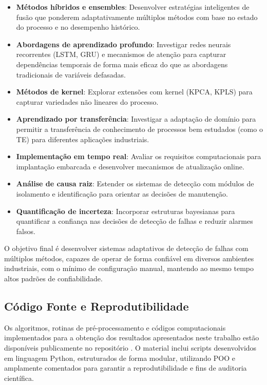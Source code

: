 \documentclass[journal]{IEEEtran}
\begin{document}
\begin{itemize}
    \item \textbf{Métodos híbridos e ensembles}: Desenvolver estratégias inteligentes de fusão que ponderem adaptativamente múltiplos métodos com base no estado do processo e no desempenho histórico.
    \item \textbf{Abordagens de aprendizado profundo}: Investigar redes neurais recorrentes (LSTM, GRU) e mecanismos de atenção para capturar dependências temporais de forma mais eficaz do que as abordagens tradicionais de variáveis defasadas.
    \item \textbf{Métodos de kernel}: Explorar extensões com kernel (KPCA, KPLS) para capturar variedades não lineares do processo.
    \item \textbf{Aprendizado por transferência}: Investigar a adaptação de domínio para permitir a transferência de conhecimento de processos bem estudados (como o TE) para diferentes aplicações industriais.
    \item \textbf{Implementação em tempo real}: Avaliar os requisitos computacionais para implantação embarcada e desenvolver mecanismos de atualização online.
    \item \textbf{Análise de causa raiz}: Estender os sistemas de detecção com módulos de isolamento e identificação para orientar as decisões de manutenção.
    \item \textbf{Quantificação de incerteza}: Incorporar estruturas bayesianas para quantificar a confiança nas decisões de detecção de falhas e reduzir alarmes falsos.
\end{itemize}

O objetivo final é desenvolver sistemas adaptativos de detecção de falhas com múltiplos métodos, capazes de operar de forma confiável em diversos ambientes industriais, com o mínimo de configuração manual, mantendo ao mesmo tempo altos padrões de confiabilidade.



\subsection{Código Fonte e Reprodutibilidade}
\label{subsec:fonte}

Os algoritmos, rotinas de pré-processamento e códigos computacionais implementados para a obtenção dos resultados apresentados neste trabalho estão disponíveis publicamente no repositório \cite{github_saulo_2026}. O material inclui scripts desenvolvidos em linguagem Python, estruturados de forma modular, utilizando POO e amplamente comentados para garantir a reprodutibilidade e fins de auditoria científica.
\end{document}
